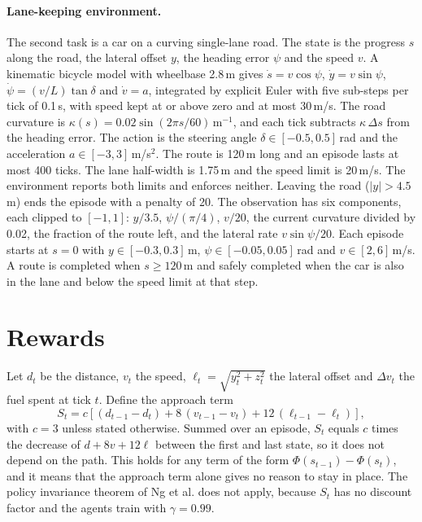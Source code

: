 \documentclass[11pt]{article}
\begin{document}
\paragraph{Lane-keeping environment.} The second task is a car on a curving
single-lane road. The state is the progress $s$ along the road, the lateral
offset $y$, the heading error $\psi$ and the speed $v$. A kinematic bicycle
model with wheelbase 2.8\,m gives
$\dot s=v\cos\psi$, $\dot y=v\sin\psi$, $\dot\psi=(v/L)\tan\delta$ and
$\dot v=a$, integrated by explicit Euler with five sub-steps per tick of
0.1\,s, with speed kept at or above zero and at most 30\,m/s. The road
curvature is $\kappa(s)=0.02\sin(2\pi s/60)$\,m$^{-1}$, and each tick subtracts
$\kappa\,\Delta s$ from the heading error. The action is the steering angle
$\delta\in[-0.5,0.5]$\,rad and the acceleration $a\in[-3,3]$\,m/s$^2$. The route
is 120\,m long and an episode lasts at most 400 ticks. The lane half-width is
1.75\,m and the speed limit is 20\,m/s. The environment reports both limits
and enforces neither.
Leaving the road ($|y|>4.5$\,m) ends the episode with a penalty of 20. The
observation has six components, each clipped to $[-1,1]$: $y/3.5$,
$\psi/(\pi/4)$, $v/20$, the current curvature divided by 0.02, the fraction of
the route left, and the lateral rate $v\sin\psi/20$. Each episode starts at
$s=0$ with $y\in[-0.3,0.3]$\,m, $\psi\in[-0.05,0.05]$\,rad and
$v\in[2,6]$\,m/s. A route is completed when $s\ge120$\,m and safely completed
when the car is also in the lane and below the speed limit at that step.

\section{Rewards}
\label{sec:rewards}

Let $d_t$ be the distance, $v_t$ the speed, $\ell_t=\sqrt{y_t^2+z_t^2}$ the lateral
offset and $\Delta v_t$ the fuel spent at tick $t$. Define the approach term
\begin{equation}
S_t = c\left[(d_{t-1}-d_t) + 8\,(v_{t-1}-v_t) + 12\,(\ell_{t-1}-\ell_t)\right],
\end{equation}
with $c=3$ unless stated otherwise. Summed over an episode, $S_t$ equals
$c$ times the decrease of $d+8v+12\ell$ between the first and last state, so it
does not depend on the path. This holds for any term of the form
$\Phi(s_{t-1})-\Phi(s_t)$, and it means that the approach term alone gives no
reason to stay in place. The policy invariance theorem of Ng et al. does not
apply, because $S_t$ has no discount factor and the agents train with
$\gamma=0.99$.
\end{document}

